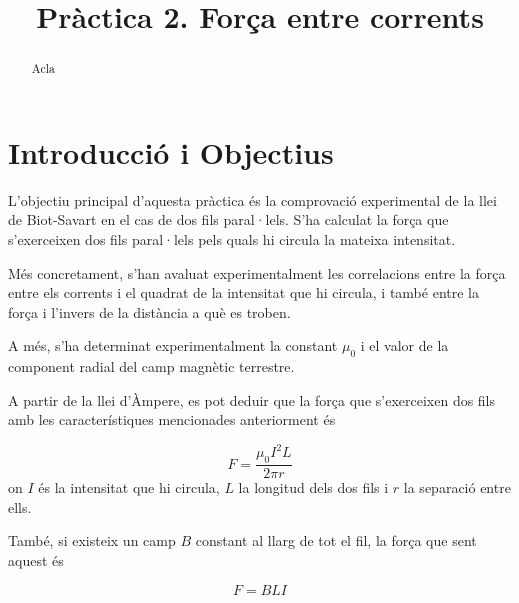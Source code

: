 \documentclass[a4paper,11pt]{article}
\title{Pràctica 2. Força entre corrents}
\date{}
\begin{document}
\maketitle
\begin{abstract}
Acla
\end{abstract}

\section{Introducció i Objectius}
L'objectiu principal d'aquesta pràctica és la comprovació experimental de la llei de Biot-Savart en el cas de dos fils paral·lels. S'ha calculat la força que s'exerceixen dos fils paral·lels pels quals hi circula la mateixa intensitat.

Més concretament, s'han avaluat experimentalment les correlacions entre la força entre els corrents i el quadrat de la intensitat que hi circula, i també entre la força i l'invers de la distància a què es troben.

 A més, s'ha determinat experimentalment la constant $\mu_0$ i el valor de la component radial del camp magnètic terrestre.

A partir de la llei d'Àmpere, es pot deduir que la força que s'exerceixen dos fils amb les característiques mencionades anteriorment és 

\begin{equation}
F=\frac{\mu_0I^2L}{2\pi r}
\end{equation}
on $I$ és la intensitat que hi circula, $L$ la longitud dels dos fils i $r$ la separació entre ells.

També, si existeix un camp $B$ constant al llarg de tot el fil, la força que sent aquest és

\begin{equation}
	F=BLI
\end{equation}
\end{document}
